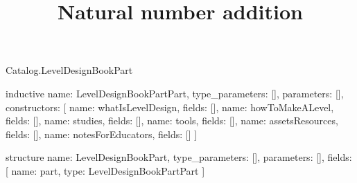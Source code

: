 \begin{lexlean}{Catalog.LevelDesignBookPart}
\title{Natural number addition}
\begin{semanticmodule}
inductive{
  name: LevelDesignBookPartPart,
  type_parameters: [],
  parameters: [],
  constructors: [
    {name: whatIsLevelDesign, fields: []},
    {name: howToMakeALevel, fields: []},
    {name: studies, fields: []},
    {name: tools, fields: []},
    {name: assetsResources, fields: []},
    {name: notesForEducators, fields: []}
  ]
}

structure{
  name: LevelDesignBookPart,
  type_parameters: [],
  parameters: [],
  fields: [
    {name: part, type: LevelDesignBookPartPart}
  ]
}
\end{semanticmodule}
\end{lexlean}

